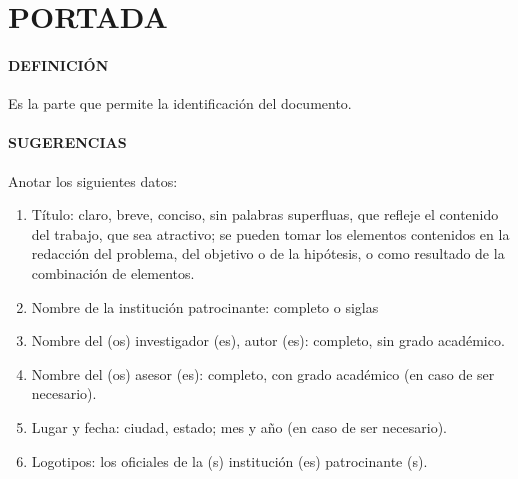 \section*{PORTADA}

\paragraph{DEFINICIÓN}
Es la parte que permite la identificación del documento.

\paragraph{SUGERENCIAS}
Anotar los siguientes datos:

\begin{enumerate}
 \item Título: claro, breve, conciso, sin palabras superfluas, que refleje el contenido del trabajo, que sea atractivo; se pueden tomar los elementos contenidos en la redacción del problema, del objetivo o de la hipótesis, o como resultado de la combinación de elementos.
 \item Nombre de la institución patrocinante: completo o siglas
 \item Nombre del (os) investigador (es), autor (es): completo, sin grado académico.
 \item Nombre del (os) asesor (es): completo, con grado académico (en caso de ser necesario).
 \item Lugar y fecha: ciudad, estado; mes y año (en caso de ser necesario).
 \item Logotipos: los oficiales de la (s) institución (es) patrocinante (s).
\end{enumerate}